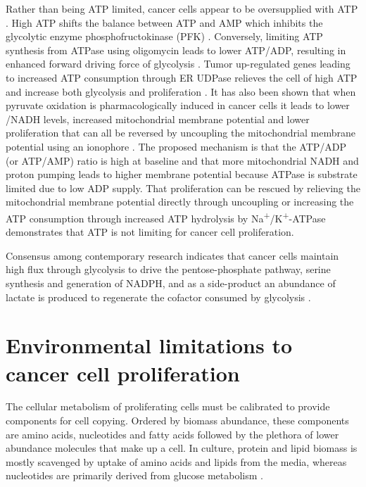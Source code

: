 Rather than being ATP limited, cancer cells appear to be oversupplied with ATP \cite{Scholnick1973-wx}.
High ATP shifts the balance between ATP and AMP which inhibits the glycolytic enzyme phosphofructokinase (PFK) \cite{Dunaway1983-ee}.
Conversely, limiting ATP synthesis from ATPase using oligomycin leads to lower ATP/ADP, resulting in enhanced forward driving force of glycolysis \cite{Park2019-cg}.
Tumor up-regulated genes leading to increased ATP consumption through ER UDPase relieves the cell of high ATP and increase both glycolysis and proliferation \cite{Fang2010-mj, Israelsen2010-ke}.
It has also been shown that when pyruvate oxidation is pharmacologically induced in cancer cells it leads to lower \NAD/NADH levels, increased mitochondrial membrane potential and lower proliferation that can all be reversed by uncoupling the mitochondrial membrane potential using an ionophore \cite{Luengo2021-kb}.
The proposed mechanism is that the ATP/ADP (or ATP/AMP) ratio is high at baseline and that more mitochondrial NADH and proton pumping leads to higher membrane potential because ATPase is substrate limited due to low ADP supply.
That proliferation can be rescued by relieving the mitochondrial membrane potential directly through uncoupling or increasing the ATP consumption through increased ATP hydrolysis by Na\textsuperscript{+}/K\textsuperscript{+}-ATPase demonstrates that ATP is not limiting for cancer cell proliferation.

Consensus among contemporary research indicates that cancer cells maintain high flux through glycolysis to drive the pentose-phosphate pathway, serine synthesis and generation of NADPH, and as a side-product an abundance of lactate is produced to regenerate the \NAD{} cofactor consumed by glycolysis \cite{Vander_Heiden2017-eq, Chandel2021-rf}.




\section{Environmental limitations to cancer cell proliferation}
The cellular metabolism of proliferating cells must be calibrated to provide components for cell copying.
Ordered by biomass abundance, these components are amino acids, nucleotides and fatty acids followed by the plethora of lower abundance molecules that make up a cell.
In culture, protein and lipid biomass is mostly scavenged by uptake of amino acids and lipids from the media, whereas nucleotides are primarily derived from glucose metabolism \cite{Hosios2016-us}.


